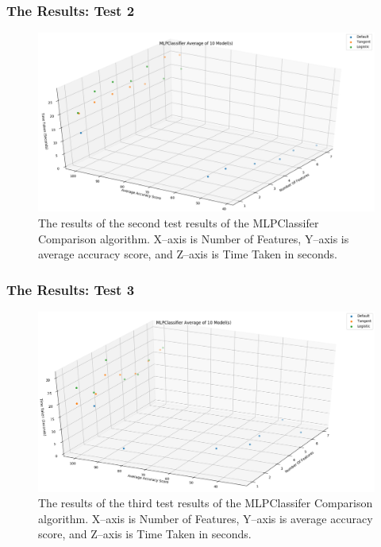 \documentclass{beamer}
\begin{document}
\begin{frame}
\frametitle{The Results: Test 2}
\begin{figure}
\centering
\includegraphics[scale=0.335]{Test_2}
\caption{\scriptsize The results of the second test results of the MLPClassifer Comparison algorithm. X--axis is Number of Features, Y--axis is average accuracy score, and Z--axis is Time Taken in seconds.}
\end{figure}
\end{frame}

\begin{frame}
\frametitle{The Results: Test 3}
\begin{figure}[h]
\centering
\includegraphics[scale=0.335]{Test_3}
\caption{\scriptsize The results of the third test results of the MLPClassifer Comparison algorithm. X--axis is Number of Features, Y--axis is average accuracy score, and Z--axis is Time Taken in seconds.}
\end{figure}
\end{frame}
\end{document}
